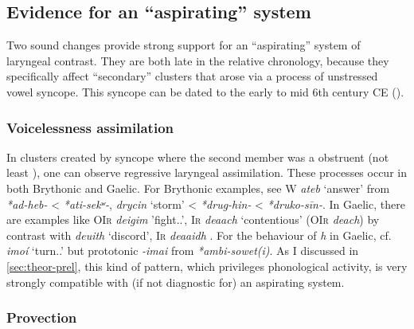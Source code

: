 \documentclass[output=paper,colorlinks,citecolor=brown]{langscibook}
\begin{document}

\subsection{Evidence for an “aspirating” system}
\label{sec:evid-an-enqu}

Two sound changes provide strong support for an \enquote{aspirating} system of laryngeal contrast. They are both late in the relative chronology, because they specifically affect \enquote{secondary} clusters that arose via a process of unstressed vowel syncope. This syncope can be dated to the early to mid 6th century CE (\cite{lheb,sims-williams1990dating}).

\subsubsection{Voicelessness assimilation}
\label{sec:post-syncope-changes}

In clusters created by syncope where the second member was a  obstruent (not least \ipa{[h]}), one can observe regressive laryngeal assimilation. These processes occur in both Brythonic and Gaelic. For Brythonic examples, see W \textit{ateb} `answer' from \textit{*ad-heb-} < \textit{*ati-sekʷ-}, \textit{drycin} `storm' < \textit{*drug-hin-} < \textit{*druko-sīn-}. In Gaelic, there are examples like \textsc{OIr} \textit{deigim} 'fight.\Prs.\Fsg', \textsc{Ir} \textit{deaach} `contentious' (\textsc{OIr} \textit{deach}) by contrast with \textit{deuith} `discord', \textsc{Ir} \textit{deaaidh} \parencite[128]{mccone}. For the behaviour of \textit{h} in Gaelic, cf. \textit{imoí} `turn.\Prs.\Tsg' but prototonic \textit{-imai} from \textit{*ambi-sowet(i)}. As I discussed in \cref{sec:theor-prel}, this kind of pattern, which privileges  phonological activity, is very strongly compatible with (if not diagnostic for) an aspirating system.

\subsubsection{Provection}
\label{sec:provection}
\end{document}
